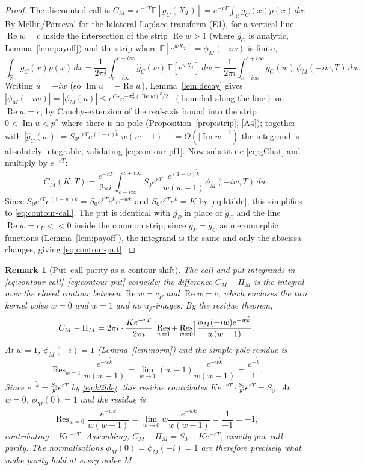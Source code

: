 \documentclass[11pt]{article}
\newtheorem{remark}[theorem]{Remark}
\newcommand{\R}{\mathbb{R}}
\newcommand{\E}{\mathbb{E}}
\DeclareMathOperator{\Real}{Re}
\DeclareMathOperator{\Imag}{Im}
\DeclareMathOperator{\Res}{Res}
\begin{document}
\begin{proof}
The discounted call is $C_M=e^{-rT}\E[g_C(X_T)]=e^{-rT}\int_\R g_C(x)p(x)
\,dx$. By Mellin/Parseval for the bilateral Laplace transform \textup{(E1)},
for a vertical line $\Real w=c$ inside the intersection of the strip
$\Real w>1$ (where $\hat g_C$ is analytic, Lemma~\ref{lem:payoff}) and the
strip where $\E[e^{wX_T}]=\phi_M(-iw)$ is finite,
\begin{equation}\label{eq:contour-pf1}
\int_\R g_C(x)p(x)\,dx
=\frac{1}{2\pi i}\int_{c-i\infty}^{c+i\infty}\hat g_C(w)\,
\E[e^{wX_T}]\,dw
=\frac{1}{2\pi i}\int_{c-i\infty}^{c+i\infty}\hat g_C(w)\,\phi_M(-iw,T)
\,dw .
\end{equation}
Writing $u=-iw$ (so $\Imag u=-\Real w$), Lemma~\ref{lem:decay} gives
$|\phi_M(-iw)|=|\phi_M(u)|\le e^{C_T}e^{-\sigma_T^2(\Real w)^2/2}\cdot
(\text{bounded along the line})$ on $\Real w=c$, by Cauchy-extension of the
real-axis bound into the strip $0<\Imag u<p^*$ where there is no pole
(Proposition~\ref{prop:strip}, \ref{A4}); together with
$|\hat g_C(w)|=S_0e^{rT}e^{(1-c)\tilde k}|w(w-1)|^{-1}=O(|\Imag w|^{-2})$
the integrand is absolutely integrable, validating \eqref{eq:contour-pf1}.
Now substitute \eqref{eq:gChat} and multiply by $e^{-rT}$:
\[
C_M(K,T)=\frac{e^{-rT}}{2\pi i}\int_{c-i\infty}^{c+i\infty}
S_0e^{rT}\frac{e^{(1-w)\tilde k}}{w(w-1)}\phi_M(-iw,T)\,dw.
\]
Since $S_0e^{rT}e^{(1-w)\tilde k}=S_0e^{rT}e^{\tilde k}e^{-w\tilde k}$
and $S_0e^{rT}e^{\tilde k}=K$ by \eqref{eq:ktilde}, this simplifies to
\eqref{eq:contour-call}. The put is identical with $\hat g_P$
in place of $\hat g_C$ and the line $\Real w=c_P<<0$ inside the common strip;
since $\hat g_P=\hat g_C$ as meromorphic functions (Lemma~\ref{lem:payoff}),
the integrand is the same and only the abscissa changes, giving
\eqref{eq:contour-put}.
\end{proof}

\begin{remark}[Put--call parity as a contour shift]\label{rem:parity}
The call and put integrands in \eqref{eq:contour-call}--\eqref{eq:contour-put}
coincide; the difference $C_M-\Pi_M$ is the integral over the closed contour
between $\Real w=c_P$ and $\Real w=c$, which encloses the two kernel poles
$w=0$ and $w=1$ and no $u_j$-images. By the residue theorem,
\[
C_M-\Pi_M=2\pi i\cdot\frac{K e^{-rT}}{2\pi i}
\Bigl[\Res_{w=1}+\Res_{w=0}\Bigr]
\frac{\phi_M(-iw)e^{-w\tilde k}}{w(w-1)} .
\]
At $w=1$, $\phi_M(-i)=1$ (Lemma~\ref{lem:norm}) and the simple-pole residue is
\[
\Res_{w=1}\frac{e^{-w\tilde k}}{w(w-1)}
=\lim_{w\to1}(w-1)\frac{e^{-w\tilde k}}{w(w-1)}
=\frac{e^{-\tilde k}}{1}.
\]
Since $e^{-\tilde k}=\frac{S_0}{K}e^{rT}$ by \eqref{eq:ktilde}, this residue
contributes $K e^{-rT}\cdot\frac{S_0}{K}e^{rT}=S_0$.
At $w=0$, $\phi_M(0)=1$ and the residue is
\[
\Res_{w=0}\frac{e^{-w\tilde k}}{w(w-1)}
=\lim_{w\to0}w\frac{e^{-w\tilde k}}{w(w-1)}
=\frac{1}{-1}=-1,
\]
contributing $-K e^{-rT}$. Assembling,
$C_M-\Pi_M=S_0-K e^{-rT}$,
exactly put--call parity. The normalisations $\phi_M(0)=\phi_M(-i)=1$ are
therefore precisely what make parity hold at every order $M$.
\end{remark}
\end{document}
